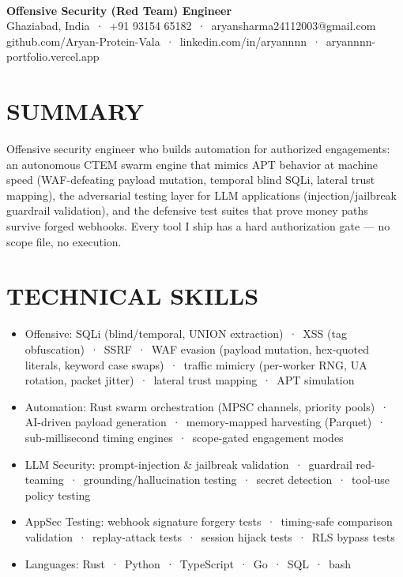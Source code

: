 \documentclass[9pt]{article}
\begin{document}
\\[3pt]
{\large\bfseries Offensive Security (Red Team) Engineer}\\[3pt]
{\small\color{greyc} Ghaziabad, India \,·\, +91 93154 65182 \,·\, aryansharma24112003@gmail.com}\vspace{-2pt}
{\small\color{greyc} github.com/Aryan-Protein-Vala \,·\, linkedin.com/in/aryannnn \,·\, aryannnn-portfolio.vercel.app}\vspace{-2pt}
\section*{SUMMARY}
Offensive security engineer who builds automation for authorized engagements: an autonomous CTEM swarm engine that mimics APT behavior at machine speed (WAF-defeating payload mutation, temporal blind SQLi, lateral trust mapping), the adversarial testing layer for LLM applications (injection/jailbreak guardrail validation), and the defensive test suites that prove money paths survive forged webhooks. Every tool I ship has a hard authorization gate  ---  no scope file, no execution.
\vspace{1pt}
\section*{TECHNICAL SKILLS}
\begin{itemize}[leftmargin=11pt,itemsep=0pt,topsep=1pt,parsep=0pt]
\item Offensive: SQLi (blind/temporal, UNION extraction) \,·\, XSS (tag obfuscation) \,·\, SSRF \,·\, WAF evasion (payload mutation, hex-quoted literals, keyword case swaps) \,·\, traffic mimicry (per-worker RNG, UA rotation, packet jitter) \,·\, lateral trust mapping \,·\, APT simulation
\item Automation: Rust swarm orchestration (MPSC channels, priority pools) \,·\, AI-driven payload generation \,·\, memory-mapped harvesting (Parquet) \,·\, sub-millisecond timing engines \,·\, scope-gated engagement modes
\item LLM Security: prompt-injection \& jailbreak validation \,·\, guardrail red-teaming \,·\, grounding/hallucination testing \,·\, secret detection \,·\, tool-use policy testing
\item AppSec Testing: webhook signature forgery tests \,·\, timing-safe comparison validation \,·\, replay-attack tests \,·\, session hijack tests \,·\, RLS bypass tests
\item Languages: Rust \,·\, Python \,·\, TypeScript \,·\, Go \,·\, SQL \,·\, bash
\end{itemize}
\end{document}
